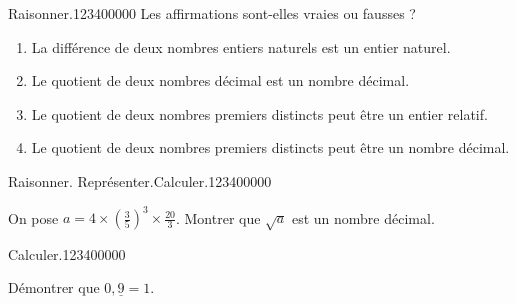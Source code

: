 \begin{pageAD}
\begin{ExoCad}{Raisonner.}{1234}{0}{0}{0}{0}{0}
Les affirmations sont-elles vraies ou fausses ?
\begin{enumerate}[leftmargin=*]
\item La différence de deux nombres entiers naturels est un entier naturel. 
\item Le quotient de deux nombres décimal est un nombre décimal. 
\item Le quotient de deux nombres premiers distincts peut être un entier relatif. 
\item Le quotient de deux nombres premiers distincts peut être un nombre décimal. 
\end{enumerate} 
 
 \end{ExoCad}


 
\begin{ExoCad}{Raisonner. Représenter.Calculer.}{1234}{0}{0}{0}{0}{0}

On pose $a=4\times \left(\frac{3}{5}\right)^3 \times \frac{20}{3}$. Montrer que $\sqrt{a}$ est un nombre décimal. 
 
\end{ExoCad}

 
 

   
\begin{ExoCad}{Calculer.}{1234}{0}{0}{0}{0}{0}
 
Démontrer que $0,\underline{9}=1$.   
 
\end{ExoCad}


 
\end{pageAD}
 
